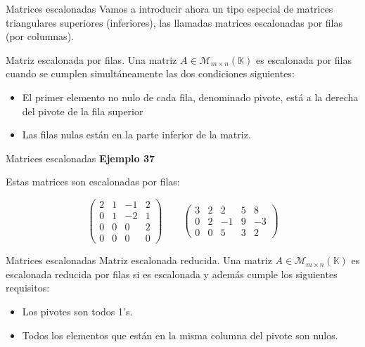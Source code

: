\documentclass[
  ignorenonframetext,
]{beamer}
\providecommand{\tightlist}{%
  \setlength{\itemsep}{0pt}\setlength{\parskip}{0pt}}
\begin{document}
\begin{frame}{Matrices escalonadas}
\protect\hypertarget{matrices-escalonadas}{}
Vamos a introducir ahora un tipo especial de matrices triangulares
superiores (inferiores), las llamadas matrices escalonadas por filas
(por columnas).

Matriz escalonada por filas. Una matriz
\(A\in\mathcal{M}_{m\times n}(\mathbb{K})\) es escalonada por filas
cuando se cumplen simultáneamente las dos condiciones siguientes:

\begin{itemize}
\tightlist
\item
  El primer elemento no nulo de cada fila, denominado pivote, está a la
  derecha del pivote de la fila superior
\item
  Las filas nulas están en la parte inferior de la matriz.
\end{itemize}
\end{frame}

\begin{frame}{Matrices escalonadas}
\protect\hypertarget{matrices-escalonadas-1}{}
\textbf{Ejemplo 37}

Estas matrices son escalonadas por filas:

\[\begin{pmatrix}2&1&-1&2\\0&1&-2&1\\0&0&0&2\\0&0&0&0\end{pmatrix}\qquad \begin{pmatrix}3&2&2&5&8\\0&2&-1&9&-3\\0&0&5&3&2\end{pmatrix} \]
\end{frame}

\begin{frame}{Matrices escalonadas}
\protect\hypertarget{matrices-escalonadas-2}{}
Matriz escalonada reducida. Una matriz
\(A\in\mathcal{M}_{m\times n}(\mathbb{K})\) es escalonada reducida por
filas si es escalonada y además cumple los siguientes requisitos:

\begin{itemize}
\tightlist
\item
  Los pivotes son todos 1's.
\item
  Todos los elementos que están en la misma columna del pivote son
  nulos.
\end{itemize}
\end{frame}
\end{document}
